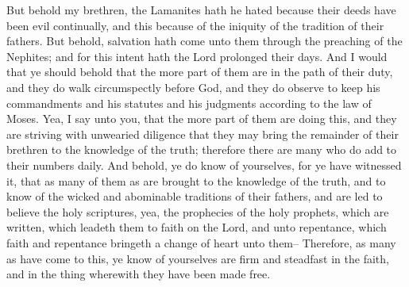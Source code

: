 But behold my brethren, the Lamanites hath he hated because their deeds have been evil continually, and this because of the iniquity of the tradition of their fathers. But behold, salvation hath come unto them through the preaching of the Nephites; and for this intent hath the Lord prolonged their days.
\bverse \iffalse And I would that ye should behold that the more part of them are in the path of their duty, and they do walk circumspectly before God, and they do observe to keep his commandments and his statutes and his judgments according to the law of Moses. \fi
And I would that ye should behold that the more part of them are in the path of their duty, and they do walk circumspectly before God, and they do observe to keep his commandments and his statutes and his judgments according to the law of Moses.
\bverse \iffalse Yea, I say unto you, that the more part of them are doing this, and they are striving with unwearied diligence that they may bring the remainder of their brethren to the knowledge of the truth; therefore there are many who do add to their numbers daily. \fi
Yea, I say unto you, that the more part of them are doing this, and they are striving with unwearied diligence that they may bring the remainder of their brethren to the knowledge of the truth; therefore there are many who do add to their numbers daily.
\bverse \iffalse And behold, ye do know of yourselves, for ye have witnessed it, that as many of them as are brought to the knowledge of the truth, and to know of the wicked and abominable traditions of their fathers, and are led to believe the holy scriptures, yea, the prophecies of the holy prophets, which are written, which leadeth them to faith on the Lord, and unto repentance, which faith and repentance bringeth a change of heart unto them-- \fi
And behold, ye do know of yourselves, for ye have witnessed it, that as many of them as are brought to the knowledge of the truth, and to know of the wicked and abominable traditions of their fathers, and are led to believe the holy scriptures, yea, the prophecies of the holy prophets, which are written, which leadeth them to faith on the Lord, and unto repentance, which faith and repentance bringeth a change of heart unto them--
\bverse \iffalse Therefore, as many as have come to this, ye know of yourselves are firm and steadfast in the faith, and in the thing wherewith they have been made free. \fi
Therefore, as many as have come to this, ye know of yourselves are firm and steadfast in the faith, and in the thing wherewith they have been made free.
